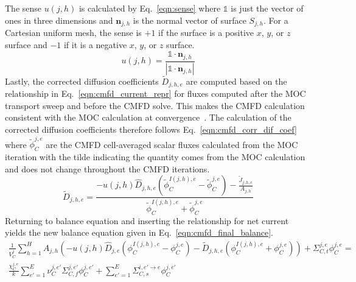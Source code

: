The sense $u(j,h)$ is calculated by Eq.~\ref{eqn:sense} where $\mathbb{1}$ is just the vector of ones in three dimensions and $\mathbf{n}_{j,h}$ is the normal vector of surface $S_{j,h}$. For a Cartesian uniform mesh, the sense is $+1$ if the surface is a positive $x$, $y$, or $z$ surface and $-1$ if it is a negative $x$, $y$, or $z$ surface.
\begin{equation}
u(j,h) = \frac{\mathbb{1} \cdot \mathbf{n}_{j,h}}{|\mathbb{1} \cdot \mathbf{n}_{j,h}|}
\label{eqn:sense}
\end{equation}
Lastly, the corrected diffusion coefficients $\tilde{D}_{j,h,e}$ are computed based on the relationship in Eq.~\ref{eqn:cmfd_current_repr} for fluxes computed after the \ac{MOC} transport sweep and before the \ac{CMFD} solve. This makes the \ac{CMFD} calculation consistent with the \ac{MOC} calculation at convergence~\cite{smith1983cmfd}. The calculation of the corrected diffusion coefficients therefore follows Eq.~\ref{eqn:cmfd_corr_dif_coef} where $\tilde{\phi}_C^{j,e}$ are the \ac{CMFD} cell-averaged scalar fluxes calculated from the \ac{MOC} iteration with the tilde indicating the quantity comes from the \ac{MOC} calculation and does not change throughout the \ac{CMFD} iterations.
\begin{equation}
\tilde{D}_{j,h,e} = \frac{-u(j, h) \hat{D}_{j,h,e} \left(\tilde{\phi}_C^{I(j,h),e} - \tilde{\phi}_C^{j,e}\right) - \frac{\tilde{J}_{j,h,e}}{A_{j,h}}}{\tilde{\phi}_C^{I(j,h),e} + \tilde{\phi}_C^{j,e}}
\label{eqn:cmfd_corr_dif_coef}
\end{equation}
Returning to balance equation and inserting the relationship for net current yields the new balance equation given in Eq.~\ref{eqn:cmfd_final_balance}.
\begin{equation}
\begin{split}
\frac{1}{V_C^j} \sum_{h=1}^H A_{j,h} \left( - u(j, h) \hat{D}_{j,e} \left(\phi_C^{I(j,h),e} - \phi_C^{j,e}\right) - \tilde{D}_{j,h,e} \left(\phi_C^{I(j,h),e} + \phi_C^{j,e}\right) \right) + \Sigma_{C,t}^{j,e} \phi_C^{j,e} = \\
\frac{\chi_C^{j,e}}{k} \sum_{e'=1}^{E} \nu_C^{j, e'} \Sigma_{C,f}^{j,e'} \phi_C^{j,e'} + \sum_{e'=1}^E  \Sigma_{C,s}^{i, e' \rightarrow e} \phi_C^{j,e'}
\end{split}
\label{eqn:cmfd_final_balance}
\end{equation}

